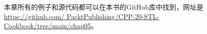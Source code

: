 

本章所有的例子和源代码都可以在本书的GitHub库中找到，网址是\url{https://github.com/	PacktPublishing/CPP-20-STL-Cookbook/tree/main/chap05}。